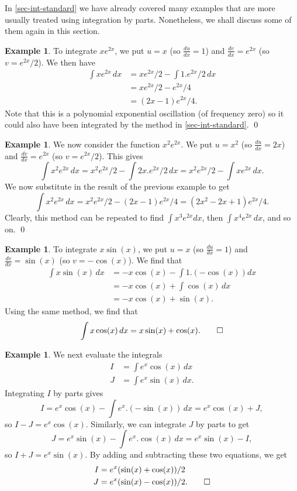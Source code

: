 \documentclass[a4paper]{book}
\theoremstyle{definition}
\newtheorem{example}[theorem]{Example}
\begin{document}
In \autoref{sec-int-standard} we have already covered many
examples that are more usually treated using integration by parts.  
Nonetheless, we shall discuss some of them again in this section.
\begin{example}
 To integrate $xe^{2x}$, we put $u=x$ (so $\frac{du}{dx}=1$) and
 $\frac{dv}{dx}=e^{2x}$ (so $v=e^{2x}/2$).  We then have
 \begin{align*}
  \int x e^{2x}\,dx &= xe^{2x}/2 - \int 1.e^{2x}/2 \,dx  \\
                    &= xe^{2x}/2 - e^{2x}/4  \\
                    &= (2x-1)e^{2x}/4.
 \end{align*}
 Note that this is a polynomial exponential oscillation (of frequency
 zero) so it could also have been integrated by the method in
 \autoref{sec-int-standard}.
 \qed
\end{example}
\begin{example}
 We now consider the function $x^2e^{2x}$.  We put $u=x^2$ (so
 $\frac{du}{dx}=2x$) and $\frac{dv}{dx}=e^{2x}$ (so $v=e^{2x}/2$).
 This gives
 \[ \int x^2e^{2x}\,dx = x^2e^{2x}/2 - \int 2x.e^{2x}/2\,dx
                       = x^2e^{2x}/2 - \int xe^{2x}\, dx.
 \]
 We now substitute in the result of the previous example to get
 \[ \int x^2e^{2x}\,dx = x^2e^{2x}/2 - (2x-1)e^{2x}/4
                       = (2x^2-2x+1)e^{2x}/4.
 \]
 Clearly, this method can be repeated to find $\int x^3e^{2x}dx$, then
 $\int x^4e^{2x}\,dx$, and so on. \qed
\end{example}
\begin{example}
 To integrate $x\sin(x)$, we put $u=x$ (so $\frac{du}{dx}=1$) and
 $\frac{dv}{dx}=\sin(x)$ (so $v=-\cos(x)$).  We find that
 \begin{align*}
  \int x\sin(x)\,dx &= -x\cos(x) - \int 1.(-\cos(x)) dx \\
     &= -x\cos(x) + \int \cos(x)\, dx \\
     &= -x\cos(x) + \sin(x).
 \end{align*}
 Using the same method, we find that
 \[ \int x\cos(x)\, dx = x\sin(x) + \cos(x). \qed \]
\end{example}
\begin{example}
 We next evaluate the integrals
 \begin{align*}
  I &= \int e^x\cos(x)\, dx \\
  J &= \int e^x\sin(x)\, dx.
 \end{align*}
 Integrating $I$ by parts gives
 \[ I = e^x\cos(x) - \int e^x.(-\sin(x))\,dx = e^x\cos(x) + J, \]
 so $I-J=e^x\cos(x)$.  Similarly, we can integrate $J$ by parts to get
 \[ J = e^x\sin(x) - \int e^x.\cos(x)\, dx = e^x\sin(x) - I, \]
 so $I+J=e^x\sin(x)$.  By adding and subtracting these two equations,
 we get
 \begin{align*}
  I &= e^x(\sin(x)+\cos(x))/2 \\
  J &= e^x(\sin(x)-\cos(x))/2. \qed
 \end{align*}
\end{example}
\end{document}
